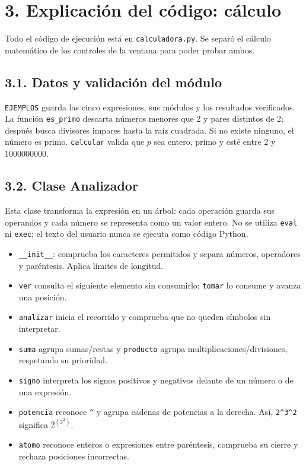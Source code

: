 \documentclass[11pt,a4paper]{article}
\begin{document}
\newpage
\section*{3. Explicación del código: cálculo}
Todo el código de ejecución está en \texttt{calculadora.py}. Se separó el
cálculo matemático de los controles de la ventana para poder probar ambos.

\subsection*{3.1. Datos y validación del módulo}
\texttt{EJEMPLOS} guarda las cinco expresiones, sus módulos y los resultados
verificados. La función \texttt{es\_primo} descarta números menores que 2 y
pares distintos de 2; después busca divisores impares hasta la raíz cuadrada.
Si no existe ninguno, el número es primo. \texttt{calcular} valida que $p$
sea entero, primo y esté entre 2 y 1000000000.

\subsection*{3.2. Clase Analizador}
Esta clase transforma la expresión en un árbol: cada operación guarda sus
operandos y cada número se representa como un valor entero. No se utiliza
\texttt{eval} ni \texttt{exec}; el texto del usuario nunca se ejecuta como
código Python.
\begin{itemize}
\item \texttt{\_\_init\_\_}: comprueba los caracteres permitidos y separa
números, operadores y paréntesis. Aplica límites de longitud.
\item \texttt{ver} consulta el siguiente elemento sin consumirlo;
\texttt{tomar} lo consume y avanza una posición.
\item \texttt{analizar} inicia el recorrido y comprueba que no queden
símbolos sin interpretar.
\item \texttt{suma} agrupa sumas/restas y \texttt{producto} agrupa
multiplicaciones/divisiones, respetando su prioridad.
\item \texttt{signo} interpreta los signos positivos y negativos delante
de un número o de una expresión.
\item \texttt{potencia} reconoce \texttt{\^{}} y agrupa cadenas de potencias
a la derecha. Así, \texttt{2\^{}3\^{}2} significa $2^{(3^2)}$.
\item \texttt{atomo} reconoce enteros o expresiones entre paréntesis,
comprueba su cierre y rechaza posiciones incorrectas.
\end{itemize}
\end{document}
